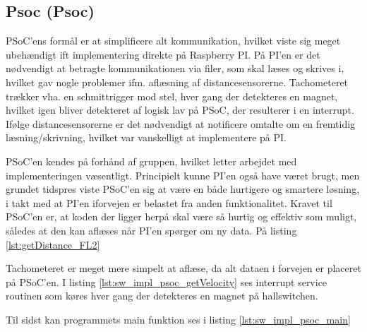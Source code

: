 \subsection{Psoc (Psoc)} \label{sub:sw_impl_psoc_psoc}

PSoC'ens formål er at simplificere alt \IIC kommunikation, hvilket viste sig meget ubehændigt ift implementering direkte på Raspberry PI. På PI'en er det nødvendigt at betragte \IIC kommunikationen via filer, som skal læses og skrives i, hvilket gav nogle problemer ifm. aflæsning af distancesensorerne. Tachometeret trækker vha. en schmittrigger mod stel, hver gang der detekteres en magnet, hvilket igen bliver detekteret af logisk lav på PSoC, der resulterer i en interrupt. Ifølge distancesensorerne er det nødvendigt at notificere omtalte om en fremtidig læsning/skrivning, hvilket var vanskelligt at implementere på PI. 

PSoC'en kendes på forhånd af gruppen, hvilket letter arbejdet med implementeringen væsentligt. Principielt kunne PI'en også have været brugt, men grundet tidspres viste PSoC'en sig at være en både hurtigere og smartere løsning, i takt med at PI'en iforvejen er belastet fra anden funktionalitet. Kravet til PSoC'en er, at koden der ligger herpå skal være så hurtig og effektiv som muligt, således at den kan aflæses når PI'en spørger om ny data. På listing \ref{lst:getDistance_FL2}




Tachometeret er meget mere simpelt at aflæse, da alt dataen i forvejen er placeret på PSoC'en. I listing \ref{lst:sw_impl_psoc_getVelocity} ses interrupt service routinen som køres hver gang der detekteres en magnet på hallswitchen.



Til sidst kan programmets main funktion ses i listing \ref{lst:sw_impl_psoc_main}



\clearpage
